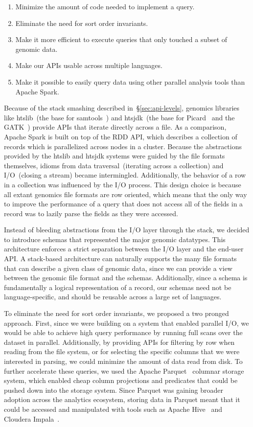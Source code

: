 \documentclass[phd]{ucbthesis}
\begin{document}
\begin{enumerate}
\item Minimize the amount of code needed to implement a query.
\item Eliminate the need for sort order invariants.
\item Make it more efficient to execute queries that only touched a subset of
  genomic data.
\item Make our APIs usable across multiple languages.
\item Make it possible to easily query data using other parallel analysis tools
  than {Apache Spark}.
\end{enumerate}

Because of the stack smashing described in~\S\ref{sec:api-levels}, genomics
libraries like {htslib}~(the base for {samtools}~\cite{li09}) and
{htsjdk}~(the base for {Picard}~\cite{picard} and the
{GATK}~\cite{mckenna10}) provide APIs that iterate directly across a
file. As a comparison, {Apache Spark} is built on top of the RDD API,
which describes a collection of records which is parallelized across nodes in a
cluster. Because the abstractions provided by the {htslib} and
{htsjdk} systems were guided by the file formats themselves, idioms from
data traversal~(iterating across a collection) and I/O~(closing a stream) became
intermingled. Additionally, the behavior of a row in a collection was influenced
by the I/O process. This design choice is because all extant genomics file formats are row
oriented, which means that the only way to improve the performance of a query
that does not access all of the fields in a record was to lazily parse the
fields as they were accessed.

Instead of bleeding abstractions from the I/O layer through the stack, we
decided to introduce schemas that represented the major genomic datatypes. This
architecture enforces a strict separation between the I/O layer and the end-user API. A
stack-based architecture can naturally supports the many file formats that can describe a given class of
genomic data, since we can provide a view between the genomic file format and
the schemas. Additionally, since a schema is fundamentally a logical
representation of a record, our schemas need not be language-specific, and
should be reusable across a large set of languages.

To eliminate the need for sort order invariants, we proposed a two pronged
approach. First, since we were building on a system that enabled parallel I/O,
we would be able to achieve high query performance by running full scans over
the dataset in parallel. Additionally, by providing APIs for filtering by row
when reading from the file system, or for selecting the specific columns that
we were interested in parsing, we could minimize the amount of data read from
disk. To further accelerate these queries, we used the {Apache
  Parquet}~\cite{parquet} columnar storage system, which enabled cheap column
projections and predicates that could be pushed down into the storage system.
Since {Parquet} was gaining broader adoption across the analytics
ecosystem, storing data in {Parquet} meant that it could be accessed
and manipulated with tools such as {Apache Hive}~\cite{thusoo09}
and {Cloudera Impala}~\cite{kornacker15}.
\end{document}
